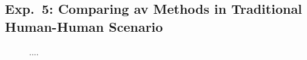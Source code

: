 \subsection{Exp.\ 5: Comparing \acs{av} Methods in Traditional Human-Human Scenario}
\label{subsec:imp_gen_res}

\begin{figure}[htbp]
    \centering
    
    \caption[Comparison of \ac{av} models on the \dataStudent{} dataset.]{....}
    \label{fig:sem_syn_blog}
\end{figure}